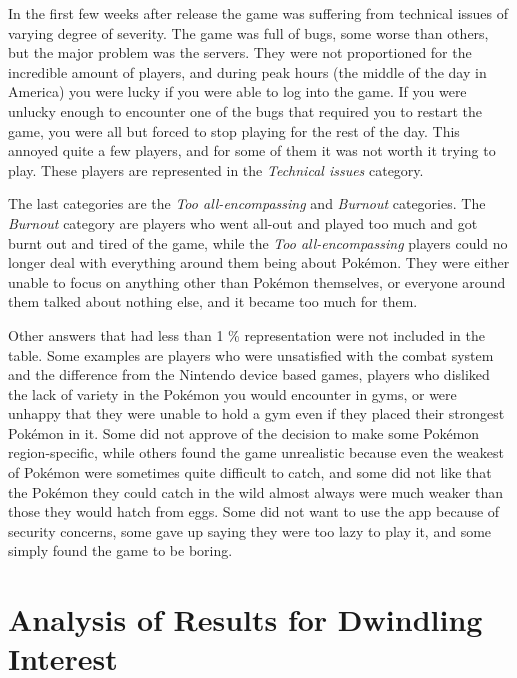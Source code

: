 In the first few weeks after release the game was suffering from technical issues of varying degree of severity. The game was full of bugs, some worse than others, but the major problem was the servers. They were not proportioned for the incredible amount of players, and during peak hours (the middle of the day in America) you were lucky if you were able to log into the game. If you were unlucky enough to encounter one of the bugs that required you to restart the game, you were all but forced to stop playing for the rest of the day. This annoyed quite a few players, and for some of them it was not worth it trying to play. These players are represented in the \emph{Technical issues} category.

The last categories are the \emph{Too all-encompassing} and \emph{Burnout} categories. The \emph{Burnout} category are players who went all-out and played too much and got burnt out and tired of the game, while the \emph{Too all-encompassing} players could no longer deal with everything around them being about Pokémon. They were either unable to focus on anything other than Pokémon themselves, or everyone around them talked about nothing else, and it became too much for them.

Other answers that had less than 1 \% representation were not included in the table. Some examples are players who were unsatisfied with the combat system and the difference from the Nintendo device based games, players who disliked the lack of variety in the Pokémon you would encounter in gyms, or were unhappy that they were unable to hold a gym even if they placed their strongest Pokémon in it. Some did not approve of the decision to make some Pokémon region-specific, while others found the game unrealistic because even the weakest of Pokémon were sometimes quite difficult to catch, and some did not like that the Pokémon they could catch in the wild almost always were much weaker than those they would hatch from eggs. Some did not want to use the app because of security concerns, some gave up saying they were too lazy to play it, and some simply found the game to be boring.

\section{Analysis of Results for Dwindling Interest}
\label{sec:success-factors-quitting-analysis}

